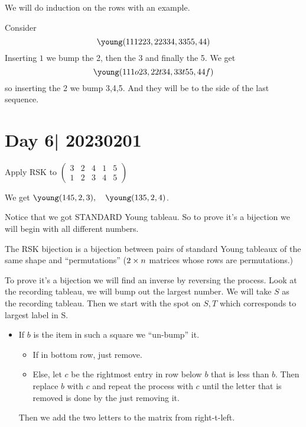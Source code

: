 \documentclass[12pt]{memoir}
\begin{document}
\begin{ptcbp}
    We will do induction on the rows with an example.
\end{ptcbp}

\begin{Ex}
    Consider 
    $$\young(111223,22334,3355,44)$$
    Inserting $1$ we bump the 2, then the 3 and finally the 5. We get 
    $$\young(111o23,22t34,33t55,44f)$$
    so inserting the 2 we bump 3,4,5. And they will be to the side of the last sequence. 
\end{Ex}

\section{Day 6| 20230201}
\begin{Ej}
    Apply RSK to $\begin{pmatrix}
        3&2&4&1&5\\1&2&3&4&5
    \end{pmatrix}$
\end{Ej}

\begin{ptcbr}
    We get 
    $\young(145,2,3),\quad \young(135,2,4)$.
\end{ptcbr}

Notice that we got STANDARD Young tableau. So to prove it's a bijection we will begin with all different numbers.

\begin{Lem}
    The RSK bijection is a bijection between pairs of standard Young tableaux of the same shape and ``permutations'' ($2\times n$ matrices whose rows are permutations.)
\end{Lem}

To prove it's a bijection we will find an inverse by reversing the process. Look at the recording tableau, we will bump out the largest number. We will take $S$ as the recording tableau. Then we start with the spot on $S,T$ which corresponds to largest label in S.
\begin{itemize}
    \item If $b$ is the item in such a square we ``un-bump'' it.
    \begin{itemize}
        \item If in bottom row, just remove.
        \item Else, let $c$ be the rightmost entry in row below $b$ that is less than $b$. Then replace $b$ with $c$ and repeat the process with $c$ until the letter that is removed is done by the just removing it. 
    \end{itemize}
    Then we add the two letters to the matrix from right-t-left.
\end{itemize}
\end{document}
